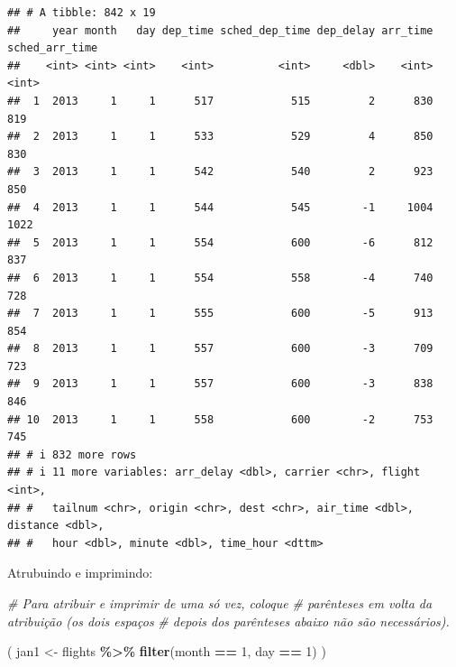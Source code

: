 \documentclass[
]{book}
\newenvironment{Shaded}{\begin{snugshade}}{\end{snugshade}}
\newcommand{\CommentTok}[1]{\textcolor[rgb]{0.56,0.35,0.01}{\textit{#1}}}
\newcommand{\DecValTok}[1]{\textcolor[rgb]{0.00,0.00,0.81}{#1}}
\newcommand{\FunctionTok}[1]{\textcolor[rgb]{0.13,0.29,0.53}{\textbf{#1}}}
\newcommand{\NormalTok}[1]{#1}
\newcommand{\OtherTok}[1]{\textcolor[rgb]{0.56,0.35,0.01}{#1}}
\newcommand{\SpecialCharTok}[1]{\textcolor[rgb]{0.81,0.36,0.00}{\textbf{#1}}}
\begin{document}
\begin{verbatim}
## # A tibble: 842 x 19
##     year month   day dep_time sched_dep_time dep_delay arr_time sched_arr_time
##    <int> <int> <int>    <int>          <int>     <dbl>    <int>          <int>
##  1  2013     1     1      517            515         2      830            819
##  2  2013     1     1      533            529         4      850            830
##  3  2013     1     1      542            540         2      923            850
##  4  2013     1     1      544            545        -1     1004           1022
##  5  2013     1     1      554            600        -6      812            837
##  6  2013     1     1      554            558        -4      740            728
##  7  2013     1     1      555            600        -5      913            854
##  8  2013     1     1      557            600        -3      709            723
##  9  2013     1     1      557            600        -3      838            846
## 10  2013     1     1      558            600        -2      753            745
## # i 832 more rows
## # i 11 more variables: arr_delay <dbl>, carrier <chr>, flight <int>,
## #   tailnum <chr>, origin <chr>, dest <chr>, air_time <dbl>, distance <dbl>,
## #   hour <dbl>, minute <dbl>, time_hour <dttm>
\end{verbatim}

Atrubuindo e imprimindo:

\begin{Shaded}
\begin{Highlighting}[]
\CommentTok{\# Para atribuir e imprimir de uma só vez, coloque}
\CommentTok{\# parênteses em volta da atribuição (os dois espaços}
\CommentTok{\# depois dos parênteses abaixo não são necessários).}

\NormalTok{(  jan1 }\OtherTok{\textless{}{-}}\NormalTok{ flights }\SpecialCharTok{\%\textgreater{}\%} \FunctionTok{filter}\NormalTok{(month }\SpecialCharTok{==} \DecValTok{1}\NormalTok{, day }\SpecialCharTok{==} \DecValTok{1}\NormalTok{)  )}
\end{Highlighting}
\end{Shaded}
\end{document}
